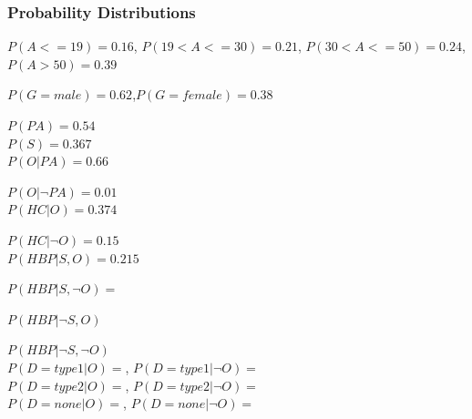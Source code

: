 \documentclass{article}
\begin{document}
\subsubsection{Probability Distributions}
$P(A <= 19) = 0.16$, $P(19 < A <= 30) = 0.21$, $P(30 < A <= 50) = 0.24$, $P(A > 50) = 0.39$ 

$P(G = male) = 0.62$,$P(G = female) = 0.38$

$P(PA) = 0.54$ \\

$P(S) = 0.367$ \\

$P(O | PA) = 0.66$

$P(O | \neg PA) = 0.01$\\


$P(HC | O) = 0.374$

$P(HC | \neg O) = 0.15$\\


$P(HBP | S, O) = 0.215$

$P(HBP | S, \neg O) = $

$P(HBP | \neg S, O)$

$P(HBP | \neg S, \neg O)$ \\


$P(D = type1 | O) = $, $P(D = type1 | \neg O) = $\\
$P(D = type2 | O) = $, $P(D = type2 | \neg O) = $\\
$P(D = none | O) = $, $P(D = none | \neg O) = $\\
\end{document}
